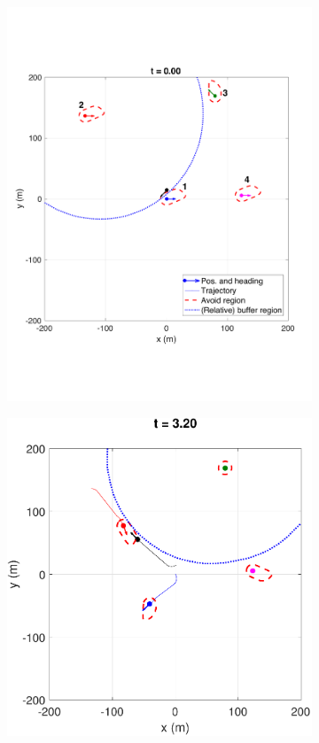 \begin{figure}[H]
\begin{subfigure}{.5\columnwidth}
  \centering
  \includegraphics[width=\columnwidth]{figs/simulate_bufferRegion_properties_worst_1}
  \subcaption{}
  \label{fig:worstcase1}
\end{subfigure}%
\begin{subfigure}{.5\columnwidth}
  \centering
  \includegraphics[width=\columnwidth]{figs/simulate_bufferRegion_properties_worst_2}

\end{subfigure}
\end{figure}

